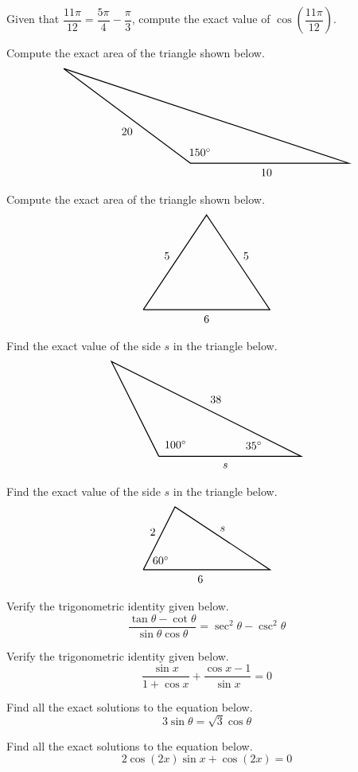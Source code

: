 \documentclass[12pt,letterpaper]{exam}
\begin{document}
\begin{questions}
\newpage
\question[10] Given that $\dfrac{11\pi}{12}= \dfrac{5\pi}{4} - \dfrac{\pi}{3}$, compute the exact value of $\cos \left( \dfrac{11\pi}{12} \right)$. 



\newpage
\question[10] Compute the exact area of the triangle shown below. 
	\[
	\begin{tikzpicture}
	\draw[line width=0.03cm] (-4,3) -- (0,0) -- (5,0) -- (-4,3);
	\node at (0.3,0.35) {$150^\circ$};
	\node at (2.4,-0.3) {$10$};
	\node at (-2,1) {$20$};
	\end{tikzpicture}
	\]



\newpage
\question[10] Compute the exact area of the triangle shown below.
	\[
	\begin{tikzpicture}
	\draw[line width=0.03cm] (-2,0) -- (0,3) -- (2,0) -- (-2,0);
	\node at (-1.25,1.7) {$5$};
	\node at (1.25,1.7) {$5$};
	\node at (0,-0.3) {$6$};
	\end{tikzpicture}
	\]



\newpage
\question[10] Find the exact value of the side $s$ in the triangle below. 
	\[
	\begin{tikzpicture}[scale=1.5]
	\draw[line width=0.03cm] (-1,0) -- (-2,2) -- (2,0) -- (-1,0);
	\node at (-0.65,0.25) {$100^\circ$};
	\node at (1.0,0.23) {$35^\circ$};
	\node at (0.2,1.2) {$38$};
	\node at (0.4,-0.2) {$s$};
	\end{tikzpicture}
	\]



\newpage
\question[10] Find the exact value of the side $s$ in the triangle below.
	\[
	\begin{tikzpicture}
	\draw[line width=0.03cm] (0,0) -- (1,2) -- (4,0) -- (0,0);
	\node at (0.55,0.3) {$60^\circ$};
	\node at (0.3,1.2) {$2$};
	\node at (1.8,-0.3) {$6$};
	\node at (2.5,1.3) {$s$};
	\end{tikzpicture}
	\]



\newpage
\question[10] Verify the trigonometric identity given below.
	\[
	\dfrac{\tan \theta - \cot \theta}{\sin \theta \cos \theta}= \sec^2 \theta - \csc^2 \theta
	\]



\newpage
\question[10] Verify the trigonometric identity given below.
	\[
	\dfrac{\sin x}{1 + \cos x} + \dfrac{\cos x - 1}{\sin x}= 0 
	\]



\newpage
\question[10] Find all the exact solutions to the equation below.
	\[
	3\sin \theta= \sqrt{3} \cos \theta
	\]



\newpage
\question[10] Find all the exact solutions to the equation below.
	\[
	2 \cos(2x) \sin x + \cos(2x)= 0 
	\]


\end{questions}
\end{document}
